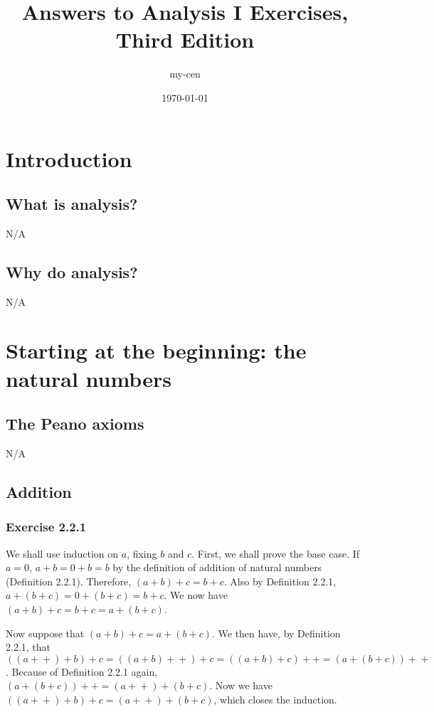 \documentclass[12pt, oneside]{book}
\title{Answers to Analysis I Exercises, Third Edition}
\author{my-cen}
\date{\today}
\newcommand{\increment}{\! + \! +}
\begin{document}
	\maketitle
	\tableofcontents
	
	\chapter{Introduction}
	
	\section{What is analysis?}
	
	N/A
	
	\section{Why do analysis?}
	
	N/A
	
	\chapter{Starting at the beginning: the natural numbers}
	
	\section{The Peano axioms}
	
	N/A
	
	\section{Addition}
	
	\subsection*{Exercise 2.2.1}
	
	We shall use induction on $a$, fixing $b$ and $c$. First, we shall prove the base case. If $a = 0$, $a + b = 0 + b = b$ by the definition of addition of natural numbers  (Definition 2.2.1). Therefore, $(a + b) + c = b + c$. Also by Definition 2.2.1, $a + (b + c) = 0 + (b + c) = b + c$. We now have $(a + b) + c = b + c = a + (b + c)$.
	
	Now suppose that $(a + b) + c = a + (b + c)$. We then have, by Definition 2.2.1, that $((a\increment) + b) + c = ((a + b)\increment) + c = ((a + b) + c)\increment = (a + (b + c))\increment$. Because of Definition 2.2.1 again, $(a + (b + c))\increment = (a\increment) + (b + c)$. Now we have $((a\increment) + b) + c = (a\increment) + (b + c)$, which closes the induction.
	
\end{document}
